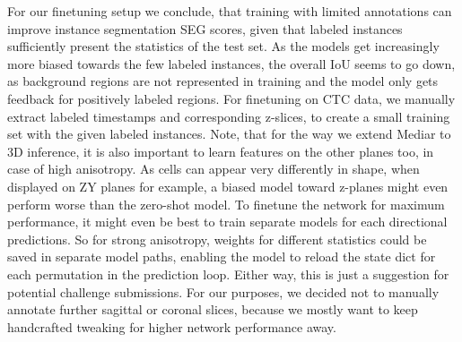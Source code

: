 For our finetuning setup we conclude, that training with limited annotations can improve instance segmentation SEG scores, given that labeled instances sufficiently present the statistics of the test set. As the models get increasingly more biased towards the few labeled instances, the overall IoU seems to go down, as background regions are not represented in training and the model only gets feedback for positively labeled regions. For finetuning on CTC data, we manually extract labeled timestamps and corresponding z-slices, to create a small training set with the given labeled instances. Note, that for the way we extend Mediar to 3D inference, it is also important to learn features on the other planes too, in case of high anisotropy. As cells can appear very differently in shape, when displayed on ZY planes for example, a biased model toward z-planes might even perform worse than the zero-shot model. To finetune the network for maximum performance, it might even be best to train separate models for each directional predictions. So for strong anisotropy, weights for different statistics could be saved in separate model paths, enabling the model to reload the state dict for each permutation in the prediction loop. Either way, this is just a suggestion for potential challenge submissions. For our purposes, we decided not to manually annotate further sagittal or coronal slices, because we mostly want to keep handcrafted tweaking for higher network performance away.
